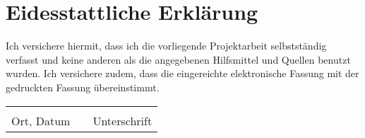 \documentclass[Thesis.tex]{subfiles}
\begin{document}
\section*{Eidesstattliche Erklärung}
Ich versichere hiermit, dass ich die vorliegende Projektarbeit selbstständig verfasst und keine anderen als die angegebenen Hilfsmittel und Quellen benutzt wurden.
Ich versichere zudem, dass die eingereichte elektronische Fassung mit der gedruckten Fassung übereinstimmt.

\vspace*{3cm}

\begin{center}
  \begin{tabular}{cp{3cm}c}
    \underline{\hspace{5cm}}  & & \underline{\hspace{5cm}} \\
    Ort, Datum                & & Unterschrift \\
  \end{tabular}
\end{center}
\end{document}
